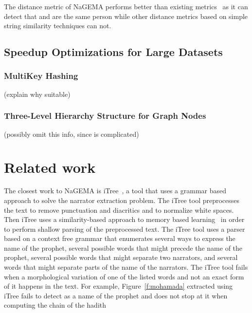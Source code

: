 \documentclass[11pt]{article}
\begin{document}
The distance metric of NaGEMA performs better than       
existing metrics~\cite{Azmi-2010} as it can detect that  
 and  are the same person
while other distance metrics based on simple
string similarity techniques can not. 

\subsection{Speedup Optimizations for Large Datasets}

\subsubsection{MultiKey Hashing}

(explain why suitable)

\subsubsection{Three-Level Hierarchy Structure for Graph Nodes}

(possibly omit this info, since is complicated)


\section{Related work }
\label{sec:related}


The closest work to NaGEMA is 
iTree~\cite{Azmi-2010,iTree}, a 
tool that uses a grammar based approach to solve 
the narrator extraction problem. 
The iTree tool preprocesses the text to remove 
punctuation and diacritics and to normalize white
spaces. 
Then iTree uses a similarity-based approach
to memory based learning~\cite{Azmi-2010} 
in order to perform 
shallow parsing of the preprocessed text. 
The iTree tool uses a parser based on a context
free grammar that enumerates several ways to express
the name of the prophet, several possible words that 
might precede the name of the prophet, several possible
words that might separate two narrators, and several
words that might separate parts of the name of 
the narrators.
The iTree tool fails when a morphological variation of 
one of the 
listed words and not an exact form of it
happens in the text. 
For example, Figure~\ref{f:mohamada} extracted 
using iTree fails to detect  as a name of the
prophet and does not stop at it when computing the chain 
of the hadith
\transfalse
{}
\transtrue
\vocalize
\end{document}
